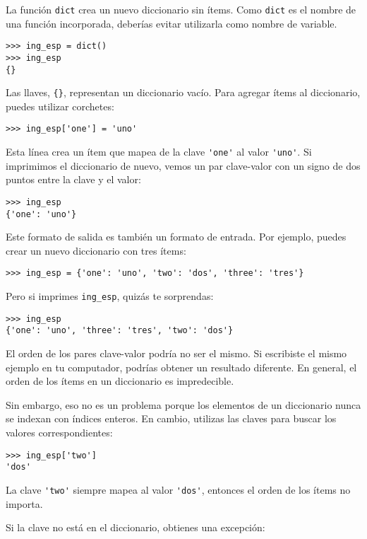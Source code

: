\documentclass[10pt]{book}
\begin{document}
La función {\tt dict} crea un nuevo diccionario sin ítems.
Como {\tt dict} es el nombre de una función incorporada,
deberías evitar utilizarla como nombre de variable.

\begin{verbatim}
>>> ing_esp = dict()
>>> ing_esp
{}
\end{verbatim}

Las llaves, \verb"{}", representan un diccionario vacío.
Para agregar ítems al diccionario, puedes utilizar corchetes:

\begin{verbatim}
>>> ing_esp['one'] = 'uno'
\end{verbatim}
%
Esta línea crea un ítem que mapea de la clave
\verb"'one'" al valor \verb"'uno'".  Si imprimimos el
diccionario de nuevo, vemos un par clave-valor con un signo de dos puntos
entre la clave y el valor:

\begin{verbatim}
>>> ing_esp
{'one': 'uno'}
\end{verbatim}
%
Este formato de salida es también un formato de entrada.  Por ejemplo,
puedes crear un nuevo diccionario con tres ítems:

\begin{verbatim}
>>> ing_esp = {'one': 'uno', 'two': 'dos', 'three': 'tres'}
\end{verbatim}
%
Pero si imprimes {\tt ing\_esp}, quizás te sorprendas:

\begin{verbatim}
>>> ing_esp
{'one': 'uno', 'three': 'tres', 'two': 'dos'}
\end{verbatim}
%
El orden de los pares clave-valor podría no ser el mismo.  Si
escribiste el mismo ejemplo en tu computador, podrías obtener un
resultado diferente.  En general, el orden de los ítems en
un diccionario es impredecible.

Sin embargo, eso no es un problema porque
los elementos de un diccionario nunca se indexan con índices enteros.
En cambio, utilizas las claves para buscar los valores correspondientes:

\begin{verbatim}
>>> ing_esp['two']
'dos'
\end{verbatim}
%
La clave \verb"'two'" siempre mapea al valor \verb"'dos'", entonces el orden
de los ítems no importa.

Si la clave no está en el diccionario, obtienes una excepción:
\end{document}
